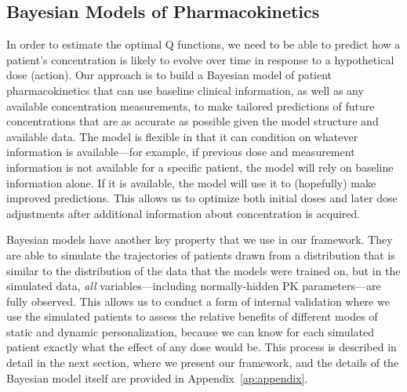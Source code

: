 \subsection{Bayesian Models of Pharmacokinetics}

In order to estimate the optimal Q functions, we need to be able to predict how a patient's concentration is likely to evolve over time in response to a hypothetical dose (action).  Our approach is to build a Bayesian model of patient pharmacokinetics that can use baseline clinical information, as well as any available concentration measurements, to make tailored predictions of future concentrations that are as accurate as possible given the model structure and available data. The model is flexible in that it can condition on whatever information is available---for example, if previous dose and measurement information is not available for a specific patient, the model will rely on baseline information alone. If it is available, the model will use it to (hopefully) make improved predictions. This allows us to optimize both initial doses and later dose adjustments after additional information about concentration is acquired.

Bayesian models have another key property that we use in our framework. They are able to simulate the trajectories of patients drawn from a distribution that is similar to the distribution of the data that the models were trained on, but in the simulated data, \textit{all} variables---including normally-hidden PK parameters---are fully observed. This allows us to conduct a form of internal validation where we use the simulated patients to assess the relative benefits of different modes of static and dynamic personalization, because we can know for each simulated patient exactly what the effect of any dose would be. This process is described in detail in the next section, where we present our framework, and the details of the Bayesian model itself are provided in Appendix~\ref{ap:appendix}.
